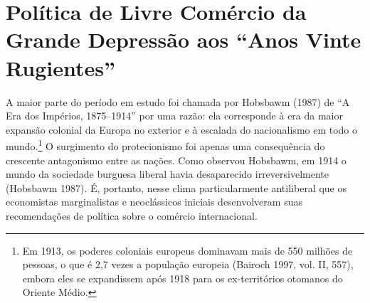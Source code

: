 \documentclass[12pt]{article}
\begin{document}
\section*{Política de Livre Comércio da Grande Depressão aos “Anos Vinte Rugientes”}

A maior parte do período em estudo foi chamada por Hobsbawm (1987) de “A Era dos Impérios, 1875–1914” por uma razão: ela corresponde à era da maior expansão colonial da Europa no exterior e à escalada do nacionalismo em todo o mundo.\footnote{Em 1913, os poderes coloniais europeus dominavam mais de 550 milhões de pessoas, o que é 2,7 vezes a população europeia (Bairoch 1997, vol. II, 557), embora eles se expandissem após 1918 para os ex-territórios otomanos do Oriente Médio.} O surgimento do protecionismo foi apenas uma consequência do crescente antagonismo entre as nações. Como observou Hobsbawm, em 1914 o mundo da sociedade burguesa liberal havia desaparecido irreversivelmente (Hobsbawm 1987). É, portanto, nesse clima particularmente antiliberal que os economistas marginalistas e neoclássicos iniciais desenvolveram suas recomendações de política sobre o comércio internacional.
\end{document}
